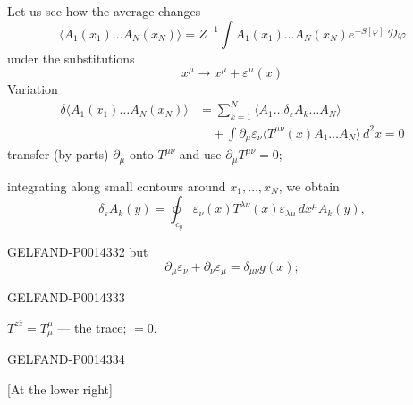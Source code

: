 Let us see how the average changes
\begin{equation*}
\tag{23}
\langle A_1(x_1)\ldots A_N(x_N)\rangle
=Z^{-1}\int A_1(x_1)\ldots A_N(x_N)e^{-S[\varphi]}\,\mathcal D\varphi
\end{equation*}
under the substitutions
\begin{equation*}
\tag{24}
x^\mu\to x^\mu+\varepsilon^\mu(x)
\end{equation*}
Variation
\begin{equation*}
\tag{25}
\begin{aligned}
\delta\langle A_1(x_1)\ldots A_N(x_N)\rangle
&=\sum_{k=1}^{N}\langle A_1\ldots\delta_\varepsilon A_k\ldots A_N\rangle\\
&\quad+\int\partial_\mu\varepsilon_\nu
\langle T^{\mu\nu}(x)A_1\ldots A_N\rangle\,d^2x=0
\end{aligned}
\end{equation*}
transfer (by parts) \(\partial_\mu\) onto \(T^{\mu\nu}\) and use
\(\partial_\mu T^{\mu\nu}=0\);

integrating along small contours around \(x_1,\ldots,x_N\), we obtain
\[
\delta_\varepsilon A_k(y)=\oint_{c_y}
\varepsilon_\nu(x)T^{\lambda\nu}(x)\varepsilon_{\lambda\mu}\,dx^\mu A_k(y),
\]
\begin{GelfandAdjacentEvidence}{GELFAND-P001433}{2}
but
\[
\partial_\mu\varepsilon_\nu+\partial_\nu\varepsilon_\mu=\delta_{\mu\nu}g(x);
\]
\end{GelfandAdjacentEvidence}
\begin{GelfandAdjacentEvidence}{GELFAND-P001433}{3}


\(T^{z\bar z}=T^\mu_\mu\) — the trace; \(=0\).
\end{GelfandAdjacentEvidence}
\begin{GelfandAdjacentEvidence}{GELFAND-P001433}{4}


[At the lower right]
\end{GelfandAdjacentEvidence}



